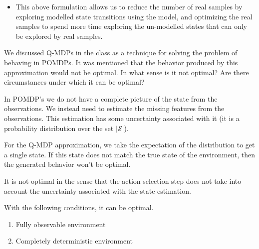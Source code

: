 \documentclass[addpoints,12pt,solution]{exam}
\begin{document}
\begin{questions}
\begin{solution}
\begin{itemize}
                \item This above formulation allows us to reduce the number of real samples by exploring modelled state transitions using the model,
                and optimizing the real samples to spend more time exploring the un-modelled states that can only be explored by real samples.
            \end{itemize}

        \end{solution}

        \question[4] We discussed Q-MDPs in the class as a technique for solving the problem of behaving in POMDPs. It was mentioned that the behavior produced by this approximation would not be optimal. In what sense is it not optimal? Are there circumstances under which it can be optimal?

        \begin{solution}
            In POMDP's we do not have a complete picture of the state from the observations.
            We instead need to estimate the missing features from the observations.
            This estimation has some uncertainty associated with it (it is a probability distribution over the set $|\mathcal{S}|$).

            For the Q-MDP approximation, we take the expectation of the distribution to get a single state.
            If this state does not match the true state of the environment, then the generated behavior won't be optimal.

            It is not optimal in the sense that the action selection step does not take into account the uncertainty
            associated with the state estimation.

            With the following conditions, it can be optimal.
            \begin{enumerate}
                \item Fully observable environment
                \item Completely deterministic environment
            \end{enumerate}

        \end{solution}


\end{questions}
\end{document}

